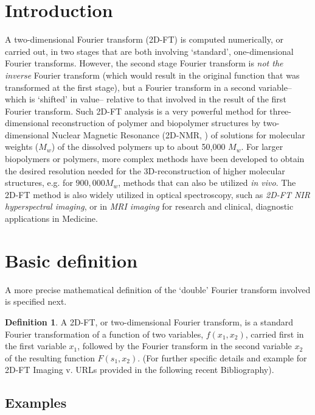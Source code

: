 \documentclass[12pt]{article}
\theoremstyle{plain}
\theoremstyle{definition}
\newtheorem{definition}{Definition}[section]
\numberwithin{equation}{section}
\begin{document}
\section{Introduction}

 A two-dimensional Fourier transform (2D-FT) is computed numerically, or carried out, in two stages that are both
involving `standard', one-dimensional Fourier transforms. However, the second stage
Fourier transform is \emph{not the inverse} Fourier transform (which would result in the original 
function that was transformed at the first stage), but a Fourier transform in a second variable--
which is `shifted' in value-- relative to that involved in the result of the first Fourier transform.
Such 2D-FT analysis is a very powerful method for three-dimensional reconstruction
of polymer and biopolymer structures by two-dimensional Nuclear Magnetic Resonance (2D-NMR, \cite{KurtWutrich86})
of solutions for molecular weights ($M_w$) of the dissolved polymers up to about 50,000 $M_w$. 
For larger biopolymers or polymers, more complex methods have been developed to obtain the desired
resolution needed for the 3D-reconstruction of higher molecular structures, e.g. for $900,000 M_w$,
methods that can also be utilized \emph{in vivo}. The 2D-FT method is also widely utilized in optical spectroscopy, such as \emph{2D-FT NIR hyperspectral imaging}, or in \emph{MRI imaging} for research and clinical, diagnostic applications in Medicine. 

\section{Basic definition}
  A more precise mathematical definition of the `double' Fourier transform involved is specified next. 

\begin{definition}
  A 2D-FT, or two-dimensional Fourier transform, is a standard Fourier transformation of a function
of two variables, $f(x_1, x_2)$, carried first in the first variable $x_1$, followed by the Fourier transform
in the second variable $x_2$ of the resulting function $F(s_1, x_2)$. (For further specific details and example
for 2D-FT Imaging v. URLs provided in the following recent Bibliography).
\end{definition}

\subsection{Examples}
 
\end{document}
